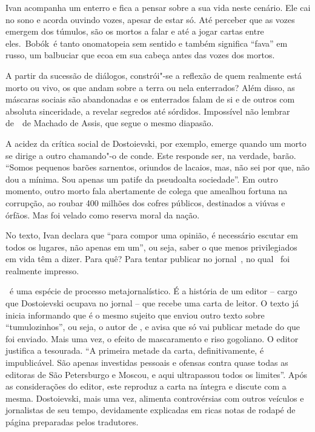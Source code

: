 \begin{changemargin}
Ivan acompanha um enterro e fica a pensar sobre a sua vida neste cenário. Ele cai no sono e acorda ouvindo vozes, apesar de estar só. Até perceber que as vozes emergem dos túmulos, são os mortos a falar e até a jogar cartas entre eles. Bobók é tanto onomatopeia sem sentido e também significa “fava” em russo, um balbuciar que ecoa em sua cabeça antes das vozes dos mortos. 

A partir da sucessão de diálogos, constrói"-se a reflexão de quem realmente está morto ou vivo, os que andam sobre a terra ou nela enterrados? Além disso, as máscaras sociais são abandonadas e os enterrados falam de si e de outros com absoluta sinceridade, a revelar segredos até sórdidos. Impossível não lembrar de {} de Machado de Assis, que segue o mesmo diapasão. 

A acidez da crítica social de Dostoievski, por exemplo, emerge quando um morto se dirige a outro chamando"-o de conde. Este responde ser, na verdade, barão. “Somos pequenos barões sarnentos, oriundos de lacaios, mas, não sei por que, não dou a mínima. Sou apenas um patife da pseudoalta sociedade”. Em outro momento, outro morto fala abertamente de colega que amealhou fortuna na corrupção, ao roubar 400 milhões dos cofres públicos, destinados a viúvas e órfãos. Mas foi velado como reserva moral da nação. 

No texto, Ivan declara que “para compor uma opinião, é necessário escutar em todos os lugares, não apenas em um”, ou seja, saber o que menos privilegiados em vida têm a dizer. Para quê? Para tentar publicar no jornal {}, no qual {} foi realmente impresso. 

{} é uma espécie de processo metajornalístico. É a história de um editor – cargo que Dostoievski ocupava no jornal – que recebe uma carta de leitor. O texto já inicia informando que é o mesmo sujeito que enviou outro texto sobre “tumulozinhos”, ou seja, o autor de {}, e avisa que só vai publicar metade do que foi enviado. Mais uma vez, o efeito de mascaramento e riso gogoliano. O editor justifica a tesourada. “A primeira metade da carta, definitivamente, é impublicável. São apenas investidas pessoais e ofensas contra quase todas as editoras de São Petersburgo e Moscou, e aqui ultrapassou todos os limites”. Após as considerações do editor, este reproduz a carta na íntegra e discute com a mesma. Dostoievski, mais uma vez, alimenta controvérsias com outros veículos e jornalistas de seu tempo, devidamente explicadas em ricas notas de rodapé de página preparadas pelos tradutores. 


\end{changemargin}
